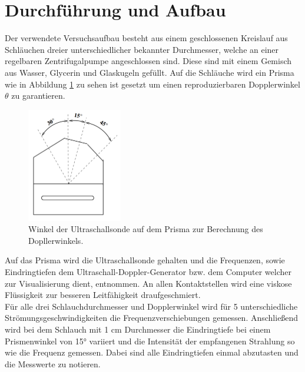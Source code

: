 \section{Durchführung und Aufbau}
\label{sec:Durchführung}
Der verwendete Versuchsaufbau besteht aus einem geschlossenen Kreislauf aus Schläuchen dreier unterschiedlicher bekannter Durchmesser, welche an einer regelbaren Zentrifugalpumpe angeschlossen sind. Diese sind mit einem Gemisch aus Wasser, Glycerin und Glaskugeln gefüllt. Auf die Schläuche wird ein Prisma wie in Abbildung \ref{fig:Doppler} zu sehen ist gesetzt um einen reproduzierbaren Dopplerwinkel $\theta$ zu garantieren.

\begin{figure}
  \centering
  \includegraphics[height=5cm]{picture/Winkel.png}
  \caption{Winkel der Ultraschallsonde auf dem Prisma zur Berechnung des Dopllerwinkels. \cite[3]{sample}}
  \label{fig:Doppler}
\end{figure}

Auf das Prisma wird die Ultraschallsonde gehalten und die Frequenzen, sowie Eindringtiefen dem Ultraschall-Doppler-Generator bzw. dem Computer welcher zur Visualisierung dient, entnommen. An allen Kontaktstellen wird eine viskose Flüssigkeit zur besseren Leitfähigkeit draufgeschmiert.	\\
Für alle drei Schlauchdurchmesser und Dopplerwinkel wird für 5 unterschiedliche Strömungsgeschwindigkeiten die Frequenzverschiebungen gemessen. Anschließend wird bei dem Schlauch mit 1 cm Durchmesser die Eindringtiefe bei einem Prismenwinkel von 15° variiert und die Intensität der empfangenen Strahlung so wie die Frequenz gemessen. Dabei sind alle Eindringtiefen einmal abzutasten und die Messwerte zu notieren.
\newpage
